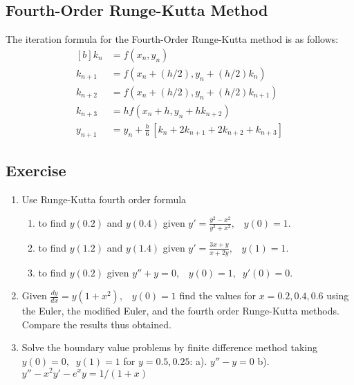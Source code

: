 \documentclass[aima203_lecturenotes_ku.tex]{subfiles}
\begin{document}
\subsection{Fourth-Order Runge-Kutta Method}
The iteration formula for the Fourth-Order Runge-Kutta method is as follows:
\begin{equation}
  \label{rungefourth}
  \begin{aligned}[b]
    k_n &= f(x_n,y_n) \\[1mm]
    k_{n+1} &= f(x_n +(h/2) ,y_n + (h/2)k_n) \\[1mm]
    k_{n+2} &= f(x_n +(h/2) ,y_n + (h/2)k_{n+1}) \\[1mm]
    k_{n+3} &= hf(x_n + h ,y_n + hk_{n+2}) \\[1mm]
    y_{n+1} &= y_n + \frac{h}{6} \,\left [k_n + 2k_{n+1} + 2k_{n+2} + k_{n+3}\right ]
  \end{aligned}
\end{equation}
\subsection{Exercise}
\begin{enumerate}
    \item Use Runge-Kutta fourth order formula
    \begin{enumerate}
        \item to find $y(0.2)$ and $y(0.4)$ given $\displaystyle y'=\frac{y^2-x^2}{y^2+x^2}, \;\;\; y(0)=1$.

        \item to find $y(1.2)$ and $y(1.4)$ given $\displaystyle y'=\frac{3x+y}{x+2y}, \;\;\; y(1)=1$.

        \item to find $y(0.2)$ given $\displaystyle y'' +y=0, \;\;\; y(0)=1, \;\; y'(0)=0$.
    \end{enumerate}

  \item Given $\displaystyle \frac{dy}{dx}=y(1+x^2), \;\;\; y(0)=1$ find the values for $x=0.2, 0.4, 0.6$ using the Euler, the modified Euler, and the fourth order Runge-Kutta methods. Compare the results thus obtained.
  \item Solve the boundary value problems by finite difference method taking $y(0)=0, \;\; y(1)=1$ for $y=0.5, 0.25$:
    \hspace{3mm} a). $y''-y=0$ \hspace{7mm} b).$y''-x^2y'-e^xy=1/(1+x)$
\end{enumerate}
\end{document}
